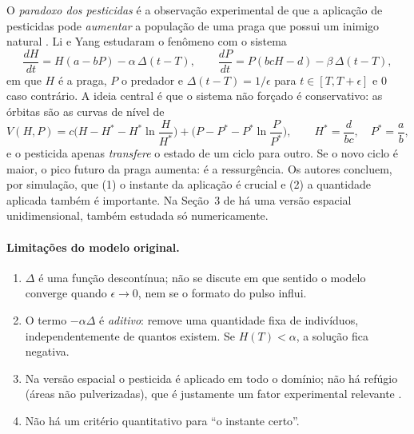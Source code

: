 \documentclass[11pt,a4paper]{article}
\numberwithin{equation}{section}
\theoremstyle{definition}
\theoremstyle{remark}
\newcommand{\Hs}{H^{*}}
\newcommand{\Ps}{P^{*}}
\begin{document}
O \emph{paradoxo dos pesticidas} é a observação experimental de que a aplicação de
pesticidas pode \emph{aumentar} a população de uma praga que possui um inimigo natural
\cite{Hardin,Lester,Heong}. Li e Yang \cite{LiYang} estudaram o fenômeno com o sistema
\begin{equation}\label{eq:liyang}
\frac{dH}{dt}=H(a-bP)-\alpha\,\Delta(t-T),\qquad
\frac{dP}{dt}=P(bcH-d)-\beta\,\Delta(t-T),
\end{equation}
em que $H$ é a praga, $P$ o predador e
$\Delta(t-T)=1/\epsilon$ para $t\in[T,T+\epsilon]$ e $0$ caso contrário. A ideia central é
que o sistema não forçado é conservativo: as órbitas são as curvas de nível de
\begin{equation}\label{eq:V}
V(H,P)=c\Big(H-\Hs-\Hs\ln\frac{H}{\Hs}\Big)+\Big(P-\Ps-\Ps\ln\frac{P}{\Ps}\Big),
\qquad \Hs=\frac{d}{bc},\quad \Ps=\frac ab,
\end{equation}
e o pesticida apenas \emph{transfere} o estado de um ciclo para outro. Se o novo ciclo é
maior, o pico futuro da praga aumenta: é a ressurgência. Os autores concluem, por
simulação, que (1) o instante da aplicação é crucial e (2) a quantidade aplicada também é
importante. Na Seção~3 de \cite{LiYang} há uma versão espacial unidimensional, também
estudada só numericamente.

\paragraph{Limitações do modelo original.}
\begin{enumerate}
\item $\Delta$ é uma função descontínua; não se discute em que sentido o modelo converge
quando $\epsilon\to0$, nem se o formato do pulso influi.
\item O termo $-\alpha\Delta$ é \emph{aditivo}: remove uma quantidade fixa de indivíduos,
independentemente de quantos existem. Se $H(T)<\alpha$, a solução fica negativa.
\item Na versão espacial o pesticida é aplicado em todo o domínio; não há refúgio
(áreas não pulverizadas), que é justamente um fator experimental relevante \cite{Lester}.
\item Não há um critério quantitativo para ``o instante certo''.
\end{enumerate}
\end{document}
